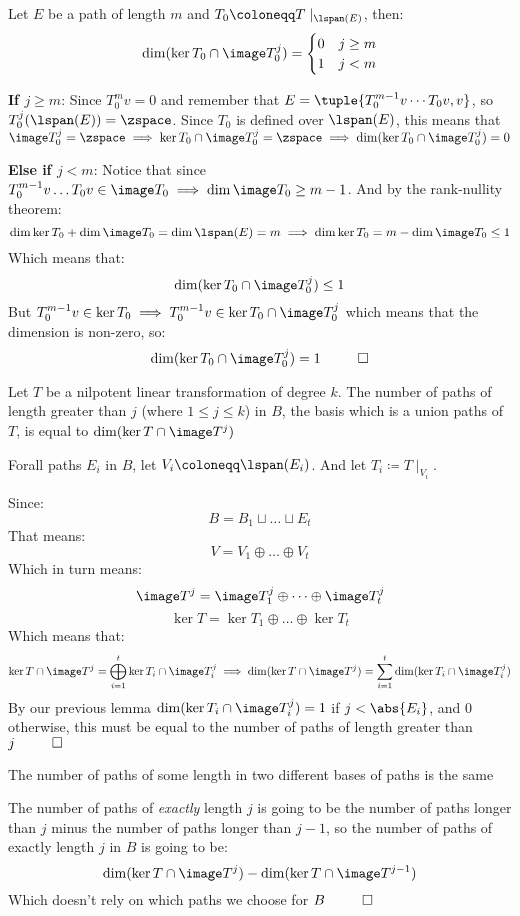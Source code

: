 \documentclass[10pt]{article}
\begin{document}
\begin{lemma}{Let $E$ be a path of length $m$ and $\displaystyle T_0\coloneqq T\mid_{\lspan(E)}$, then:
\[ \dim(\ker T_0\cap\image T_0^j)=\begin{cases} 0 & j\geq m \\ 1 & j < m \end{cases} \]}

\textbf{If $j\geq m$}: Since $T_0^mv=0$ and remember that $E=\tuple{T_0^{m-1}v\cdots T_0v,v}$, so $T_0^j(\lspan(E))=\zspace$. Since $T_0$ is defined over $\lspan(E)$, this means that $\image T_0^j=\zspace\implies\ker T_0\cap\image T_0^j=\zspace\implies\dim(\ker T_0\cap\image T_0^j)=0$

\textbf{Else if $j<m$}: Notice that since $T_0^{m-1}v\dots T_0v\in\image T_0\implies \dim\image T_0\geq m-1$. And by the rank-nullity theorem:
\[ \dim\ker T_0 + \dim\image T_0 = \dim\lspan(E) = m \implies \dim\ker T_0 = m-\dim\image T_0 \leq 1 \]
Which means that:
\[ \dim(\ker T_0\cap \image T_0^j) \leq 1 \]
But $T_0^{m-1}v\in\ker T_0\implies T_0^{m-1}v\in\ker T_0\cap\image T_0^j$ which means that the dimension is non-zero, so:
\[ \dim(\ker T_0\cap \image T_0^j) = 1 ~~ \qed \]

\end{lemma}

\begin{lemma}{Let $T$ be a nilpotent linear transformation of degree $k$. The number of paths of length greater than $j$ (where $1\leq j\leq k$) in $B$, the basis which is a union paths of $T$, is equal to $\dim(\ker T\cap\image T^j)$}

Forall paths $E_i$ in $B$, let $V_i\coloneqq\lspan(E_i)$. And let $T_i\coloneqq T\mid_{V_i}$.

Since:
\[ B = B_1\sqcup\dots\sqcup E_t \]
That means:
\[ V = V_1\oplus\dots\oplus V_t \]
Which in turn means:
\[ \image T^j = \image T^j_1 \oplus\dots\oplus\image T^j_t \]
\[ \ker T = \ker T_1\oplus\dots\oplus\ker T_t \]
Which means that:
\[ \ker T\cap\image T^j = \bigoplus_{i=1}^t \ker T_i\cap\image T^j_i \implies \dim(\ker T\cap\image T^j) = \sum_{i=1}^t \dim(\ker T_i\cap\image T^j_i) \]
By our previous lemma $\dim(\ker T_i\cap\image T^j_i)=1$ if $j<\abs{E_i}$, and $0$ otherwise, this must be equal to the number of paths of length greater than $j ~~ \qed$

\end{lemma}

\begin{corollary}{The number of paths of some length in two different bases of paths is the same}

The number of paths of \textit{exactly} length $j$ is going to be the number of paths longer than $j$ minus the number of paths longer than $j-1$, so the number of paths of exactly length $j$ in $B$ is going to be:
\[ \dim(\ker T\cap\image T^j) - \dim(\ker T\cap\image T^{j-1}) \]
Which doesn't rely on which paths we choose for $B ~~ \qed$

\end{corollary}
\end{document}
